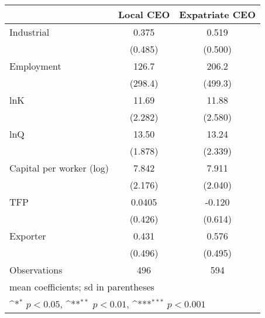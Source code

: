 {
\def\sym#1{\ifmmode^{#1}\else\(^{#1}\)\fi}
\begin{tabular}{l*{2}{c}}
\hline\hline
                    &\multicolumn{1}{c}{Local CEO}&\multicolumn{1}{c}{Expatriate CEO}\\
\hline
Industrial          &       0.375         &       0.519         \\
                    &     (0.485)         &     (0.500)         \\
[1em]
Employment          &       126.7         &       206.2         \\
                    &     (298.4)         &     (499.3)         \\
[1em]
lnK                 &       11.69         &       11.88         \\
                    &     (2.282)         &     (2.580)         \\
[1em]
lnQ                 &       13.50         &       13.24         \\
                    &     (1.878)         &     (2.339)         \\
[1em]
Capital per worker (log)&       7.842         &       7.911         \\
                    &     (2.176)         &     (2.040)         \\
[1em]
TFP                 &      0.0405         &      -0.120         \\
                    &     (0.426)         &     (0.614)         \\
[1em]
Exporter            &       0.431         &       0.576         \\
                    &     (0.496)         &     (0.495)         \\
\hline
Observations        &         496         &         594         \\
\hline\hline
\multicolumn{3}{l}{\footnotesize mean coefficients; sd in parentheses}\\
\multicolumn{3}{l}{\footnotesize \sym{*} \(p<0.05\), \sym{**} \(p<0.01\), \sym{***} \(p<0.001\)}\\
\end{tabular}
}
